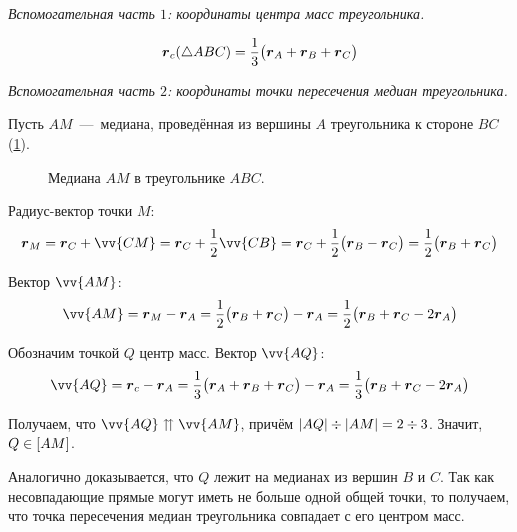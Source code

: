 \documentclass[a4paper,12pt]{article}
\begin{document}
  \begin{solution}
    \par\indent
    
    \emph{Вспомогательная часть $1$: координаты центра масс треугольника.}
    
    \[
      \boldsymbol r_c(\triangle ABC) = \frac{1}{3} \bigl(\boldsymbol r_A + \boldsymbol r_B + \boldsymbol r_C\bigr)
    \]
    
    \medskip
    
    \emph{Вспомогательная часть $2$: координаты точки пересечения медиан треугольника.}
    
    Пусть $AM$~---~медиана, проведённая из вершины $A$ треугольника к стороне $BC$ (\ref{fig:intersecting-medians}).
    
    \begin{figure}[h]
      \centering
      
      
      \caption{Медиана $AM$ в треугольнике $ABC$.}
      \label{fig:intersecting-medians}
    \end{figure}
 
    Радиус-вектор точки $M$:
    \[
      \bds r_{M} = \bds r_C + \vv{CM} = \bds r_C + \frac{1}{2} \vv{CB}
      = \bds r_C + \frac{1}{2} \bigl(\bds r_B - \bds r_C\bigr)
      = \frac{1}{2} \bigl(\bds r_B + \bds r_C\bigr)
    \]
    
    Вектор $\vv{AM}$:
    \[
      \vv{AM} = \bds r_{M} - \bds r_A
      = \frac{1}{2} \bigl(\bds r_B + \bds r_C\bigr) - \bds r_A
      = \frac{1}{2} \bigl(\bds r_B + \bds r_C - 2 \bds r_A\bigr)
    \]
    
    Обозначим точкой $Q$ центр масс.
    Вектор $\vv{AQ}$:
    \[
      \vv{AQ} = \bds r_c - \bds r_A
      = \frac{1}{3} \bigl(\bds r_A + \bds r_B + \bds r_C\bigr) - \bds r_A
      = \frac{1}{3} \bigl(\bds r_B + \bds r_C - 2 \bds r_A\bigr)
    \]
    
    Получаем, что $\vv{AQ} \hm\upuparrows \vv{AM}$, причём $|AQ| \hm\div |AM| \hm= 2 \hm\div 3$.
    Значит, $Q \hm\in [AM]$.
    
    Аналогично доказывается, что $Q$ лежит на медианах из вершин $B$ и $C$.
    Так как несовпадающие прямые могут иметь не больше одной общей точки, то получаем, что точка пересечения медиан треугольника совпадает с его центром масс.
    

\end{solution}
\end{document}
